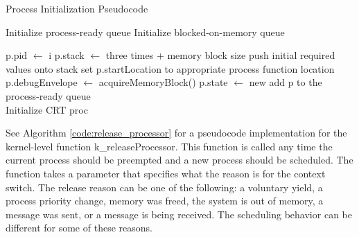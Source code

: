 \documentclass[12pt]{report}
\begin{document}
    \begin{algorithm}
        \caption{Process Initialization Pseudocode}
        \label{code:proc_init}
        \begin{algorithmic}[1]
            \State Initialize process-ready queue
            \State Initialize blocked-on-memory queue

                \State p.pid $\gets$ i
                \State p.stack $\gets$  three times + memory block size 
                \State push initial required values onto stack
                \State set p.startLocation to appropriate process function location
                \State p.debugEnvelope $\gets$ acquireMemoryBlock()
                \State p.state $\gets$ new
                \State add p to the process-ready queue
            \EndFor \\
            \State Initialize CRT proc
        \EndFunction
        \end{algorithmic}
    \end{algorithm}

    See Algorithm \ref{code:release_processor} for a pseudocode implementation
    for the kernel-level function k\_releaseProcessor. This function is called
    any time the current process should be preempted and a new process should be
    scheduled. The function takes a parameter that specifies what the reason is
    for the context switch. The release reason can be one of the following: a
    voluntary yield, a process priority change, memory was freed, the system is
    out of memory, a message was sent, or a message is being received. The scheduling
    behavior can be different for some of these reasons.
\end{document}
